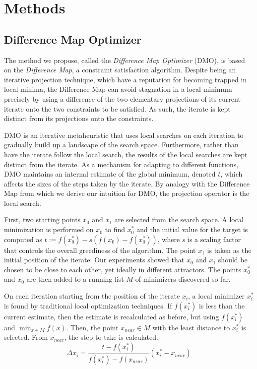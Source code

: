 \documentclass[12pt]{article}
\begin{document}
\section{Methods}

\subsection{Difference Map Optimizer}
The method we propose, called the \emph{Difference Map Optimizer} (DMO), is
based on the \emph{Difference Map}\cite{elser2007}, a constraint
satisfaction algorithm.
Despite being an iterative projection technique, which have a reputation
for becoming trapped in local minima, the Difference Map can avoid
stagnation in a local minimum precisely by using a difference of the two
elementary projections of its current iterate onto the two constraints to
be satisfied. As such, the iterate is kept distinct from its projections
onto the constraints.

DMO is an iterative metaheuristic that uses local searches on each
iteration to gradually build up a landscape of the search space.
Furthermore, rather than have the iterate follow the local search, the
results of the local searches are kept distinct from the iterate.
As a mechanism for adapting to different functions, DMO maintains an
internal estimate of the global minimum, denoted $t$, which affects the
sizes of the steps taken by the iterate. By analogy with the Difference Map
from which we derive our intuition for DMO, the projection operator is the
local search.

First, two starting points $x_0$ and $x_1$ are selected from the search
space.
A local minimization is performed on $x_0$ to find $x_0^*$ and the
initial value for the target is computed as
$t := f(x_0^*) - s (f(x_0) - f(x_0^*))$,
where $s$ is a scaling factor that controls the overall greediness of the
algorithm.
The point $x_1$ is taken as the initial position of the iterate. Our
experiments showed that $x_0$ and $x_1$ should be chosen to be close to
each other, yet ideally in different attractors.
The points $x_0^*$ and $x_0$ are then added to a running list $M$ of
minimizers discovered so far.

On each iteration starting from the position of the iterate $x_i$, a local
minimizer $x_i^*$ is found by traditional local optimization techniques.
If $f(x_i^*)$ is less than the current estimate, then the estimate is
recalculated as before, but using $f(x_i^*)$ and $\min_{x \in M} f(x)$.
Then, the point $x_{near} \in M$ with the least distance to $x_i^*$ is
selected.
From $x_{near}$, the step to take is calculated.
\begin{equation}
    \Delta x_i =
        \frac{t - f(x_i^*)}{f(x_i^*) - f(x_{near})} (x_i^* - x_{near})
    \label{eqn:dx}
\end{equation}
\end{document}
